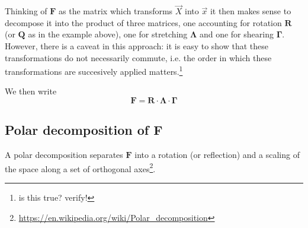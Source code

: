 Thinking of ${\bm F}$ as the matrix which transforms $\vec{X}$ into $\vec{x}$
it then makes sense to decompose it into the product of three matrices, 
one accounting for rotation ${\bm R}$ (or ${\bm Q}$ as in the example above), 
one for stretching ${\bm \Lambda}$ and
one for shearing ${\bm \Gamma}$.
However, there is a caveat in this approach: it is easy to show that 
these transformations do not necessarily commute, i.e. the order in which 
these transformations are succesively applied matters.\footnote{is this true? verify!}  

We then write
\[
{\bm F} = {\bm R} \cdot {\bm \Lambda} \cdot {\bm \Gamma}
\] 

\subsection*{Polar decomposition of ${\bm F}$}

A polar decomposition separates ${\bm F}$ into a rotation (or reflection) and a scaling of 
the space along a set of orthogonal axes\footnote{\url{https://en.wikipedia.org/wiki/Polar_decomposition}}. 

